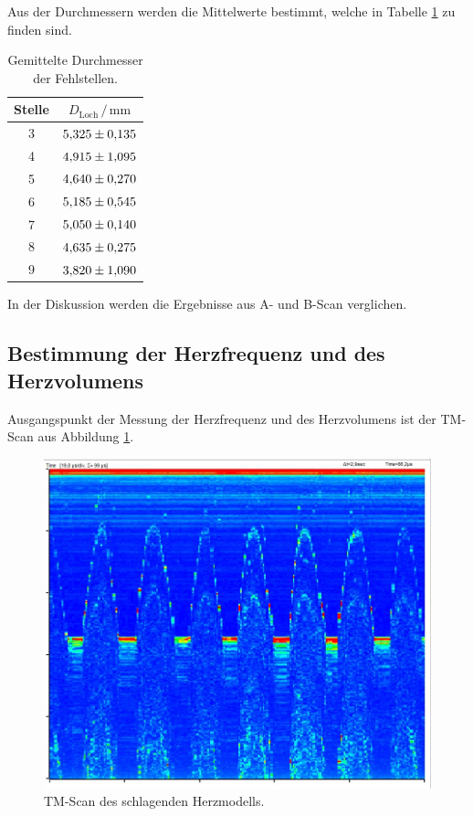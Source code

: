 Aus der Durchmessern werden die Mittelwerte bestimmt, welche in Tabelle \ref{tab:mess5} zu finden sind. 

\begin{table}
\centering
\caption{Gemittelte Durchmesser der Fehlstellen.}
\label{tab:mess5}
\begin{tabular}{c c}
\toprule
Stelle & $D_\text{Loch} \,/\, \si{\milli\meter}$\\
\midrule 
3 & $\num{5.325+-0.135}$\\
4 & $\num{4.915+-1.095}$\\
5 & $\num{4.640+-0.270}$\\
6 & $\num{5.185+-0.545}$\\
7 & $\num{5.050+-0.140}$\\
8 & $\num{4.635+-0.275}$\\
9 & $\num{3.820+-1.090}$\\
\bottomrule
\end{tabular}
\end{table}

In der Diskussion werden die Ergebnisse aus A- und B-Scan verglichen.

\subsection{Bestimmung der Herzfrequenz und des Herzvolumens}

Ausgangspunkt der Messung der Herzfrequenz und des Herzvolumens ist der TM-Scan aus 
Abbildung \ref{fig:tm}. 

\begin{figure}
  \centering
  \includegraphics[scale=0.3]{content/tm.jpg}
  \caption{TM-Scan des schlagenden Herzmodells.}
  \label{fig:tm}
\end{figure}


